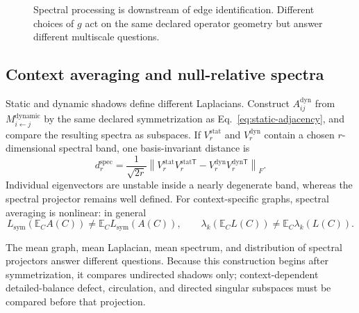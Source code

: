\documentclass[10pt]{article}
\newcommand{\E}{\mathbb E}
\theoremstyle{definition}
\theoremstyle{remark}
\newcommand{\BookInsert}[1]{}
\newcommand{\BookSpectralSection}[1]{\subsection{#1}}
\begin{document}
\ifdefined\BOOKMODE
\begin{figure}[htbp]
\centering
{}
\caption{Spectral processing is downstream of edge identification.  Different choices of $g$ act
on the same declared operator geometry but answer different multiscale questions.}
\label{fig:spectral-processing-pipeline}
\end{figure}
\fi

\BookInsert{chapters/10_graph_wavelets}

\BookSpectralSection{Context averaging and null-relative spectra}

Static and dynamic shadows define different Laplacians.  Construct
$A_{ij}^{\mathrm{dyn}}$ from $M_{i\leftarrow j}^{\mathrm{dynamic}}$ by the same declared
symmetrization as Eq.~\ref{eq:static-adjacency}, and compare the resulting spectra as subspaces.  If
$V_r^{\mathrm{stat}}$ and $V_r^{\mathrm{dyn}}$ contain a chosen $r$-dimensional spectral band,
one basis-invariant distance is
\begin{equation}
d_r^{\mathrm{spec}}
=\frac{1}{\sqrt{2r}}
\left\|V_r^{\mathrm{stat}}V_r^{\mathrm{stat}\mathsf T}
-V_r^{\mathrm{dyn}}V_r^{\mathrm{dyn}\mathsf T}\right\|_F.
\label{eq:spectral-subspace-distance}
\end{equation}
Individual eigenvectors are unstable inside a nearly degenerate band, whereas the spectral
projector remains well defined.  For context-specific graphs, spectral averaging is nonlinear:
in general
\begin{equation}
L_{\mathrm{sym}}\!\left(\E_CA(C)\right)
\ne\E_CL_{\mathrm{sym}}(A(C)),
\qquad
\lambda_k\!\left(\E_CL(C)\right)\ne\E_C\lambda_k(L(C)).
\label{eq:spectral-noncommutation}
\end{equation}
\BookInsert{chapters/10_mean_spectrum_example}
The mean graph, mean Laplacian, mean spectrum, and distribution of spectral projectors answer
different questions.  Because this construction begins after symmetrization, it compares
undirected shadows only; context-dependent detailed-balance defect, circulation, and directed
singular subspaces must be compared before that projection.
\end{document}
